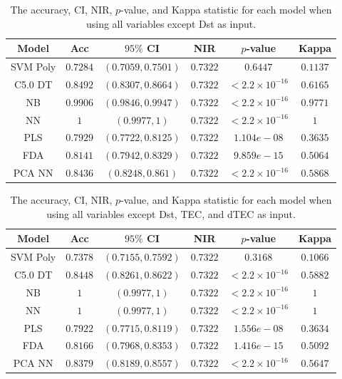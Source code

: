 \documentclass[sn-mathphys-num]{sn-jnl}%
\begin{document}
\begin{table}[!ht]
    \centering
    \caption{The accuracy, CI, NIR, $p$-value, and Kappa statistic for each model when using all variables except Dst as input.}
	\label{tab:stats:reverse:no_DisturbanceStormTime}
	\begin{tabular}{|c|c|c|c|c|c|}
		\hline
		Model & Acc & $95\%$ CI & NIR & $p$-value & Kappa \\ \hline
		SVM Poly & $0.7284$ & $(0.7059, 0.7501)$ & $0.7322$ & $0.6447$ & $0.1137$ \\ \hline
		C5.0 DT & $0.8492$ & $(0.8307, 0.8664)$ & $0.7322$ & $< 2.2 \times {10}^{-16}$ & $0.6165$ \\ \hline
		NB & $0.9906$ & $(0.9846, 0.9947)$ & $0.7322$ & $< 2.2 \times {10}^{-16}$ & $0.9771$ \\ \hline
		NN & $1$ & $(0.9977, 1)$ & $0.7322$ & $< 2.2 \times {10}^{-16}$ & $1$ \\ \hline
		PLS & $0.7929$ & $(0.7722, 0.8125)$ & $0.7322$ & $1.104e-08$ & $0.3635$ \\ \hline
		FDA & $0.8141$ & $(0.7942, 0.8329)$ & $0.7322$ & $9.859e-15$ & $0.5064$ \\ \hline
		PCA NN & $0.8436$ & $(0.8248, 0.861)$ & $0.7322$ & $< 2.2 \times {10}^{-16}$ & $0.5868$ \\ \hline
	\end{tabular}
\end{table}

\begin{table}[!ht]
    \centering
    \caption{The accuracy, CI, NIR, $p$-value, and Kappa statistic for each model when using all variables except Dst, TEC, and dTEC as input.}
	\label{tab:stats:reverse:no_TotalElectronContent}
	\begin{tabular}{|c|c|c|c|c|c|}
		\hline
		Model & Acc & $95\%$ CI & NIR & $p$-value & Kappa \\ \hline
		SVM Poly & $0.7378$ & $(0.7155, 0.7592)$ & $0.7322$ & $0.3168$ & $0.1066$ \\ \hline
		C5.0 DT & $0.8448$ & $(0.8261, 0.8622)$ & $0.7322$ & $< 2.2 \times {10}^{-16}$ & $0.5882$ \\ \hline
		NB & $1$ & $(0.9977, 1)$ & $0.7322$ & $< 2.2 \times {10}^{-16}$ & $1$ \\ \hline
		NN & $1$ & $(0.9977, 1)$ & $0.7322$ & $< 2.2 \times {10}^{-16}$ & $1$ \\ \hline
		PLS & $0.7922$ & $(0.7715, 0.8119)$ & $0.7322$ & $1.556e-08$ & $0.3634$ \\ \hline
		FDA & $0.8166$ & $(0.7968, 0.8353)$ & $0.7322$ & $1.416e-15$ & $0.5092$ \\ \hline
		PCA NN & $0.8379$ & $(0.8189, 0.8557)$ & $0.7322$ & $< 2.2 \times {10}^{-16}$ & $0.5647$ \\ \hline
	\end{tabular}
\end{table}
\end{document}
